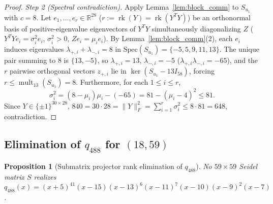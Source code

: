 \documentclass[11pt,reqno]{amsart}
\newtheorem{proposition}[theorem]{Proposition}
\theoremstyle{definition}
\theoremstyle{remark}
\numberwithin{equation}{section}
\numberwithin{table}{section}
\DeclareMathOperator{\rk}{rk}
\DeclareMathOperator{\mult}{mult}
\begin{document}
\begin{proof}
\emph{Step 2 (Spectral contradiction).}
Apply Lemma~\ref{lem:block_comm} to $S_{u_1}$ with $c = 8$. Let $e_1, \dots, e_r \in \mathbb{R}^{28}$ ($r := \rk(Y) = \rk(Y^T Y)$) be an orthonormal basis of positive-eigenvalue eigenvectors of $Y^T Y$ simultaneously diagonalizing $Z$ ($Y^T Y e_i = \sigma_i^2 e_i$, $\sigma_i^2 > 0$, $Z e_i = \mu_i e_i$). By Lemma~\ref{lem:block_comm}(2), each $e_i$ induces eigenvalues $\lambda_{+,i} + \lambda_{-,i} = 8$ in $\mathrm{Spec}(S_{u_1}) = \{-5, 5, 9, 11, 13\}$. The unique pair summing to $8$ is $\{13, -5\}$, so $\lambda_{+,i} = 13$, $\lambda_{-,i} = -5$ ($\lambda_{+,i}\lambda_{-,i} = -65$), and the $r$ pairwise orthogonal vectors $z_{+,i}$ lie in $\ker(S_{u_1} - 13I_{58})$, forcing $r \le \mult_{13}(S_{u_1}) = 8$. Furthermore, for each $1 \le i \le r$,
\[
  \sigma_i^2 = (8 - \mu_i)\mu_i - (-65) = 81 - (\mu_i - 4)^2 \le 81.
\]
Since $Y \in \{\pm 1\}^{30 \times 28}$, $840 = 30 \cdot 28 = \|Y\|_F^2 = \sum_{i=1}^r \sigma_i^2 \le 8 \cdot 81 = 648$, contradiction.
\end{proof}

\subsection{Elimination of \texorpdfstring{$q_{488}$}{q\_488} for \texorpdfstring{$(18, 59)$}{(18, 59)}}
\begin{proposition}[Submatrix projector rank elimination of $q_{488}$]\label{prop:kill488}
No $59 \times 59$ Seidel matrix $S$ realizes $q_{488}(x) = (x + 5)^{41}\allowbreak (x - 15)\allowbreak (x - 13)^6\allowbreak (x - 11)^7\allowbreak (x - 10)\allowbreak (x - 9)^2\allowbreak (x - 7)$.
\end{proposition}
\end{document}
